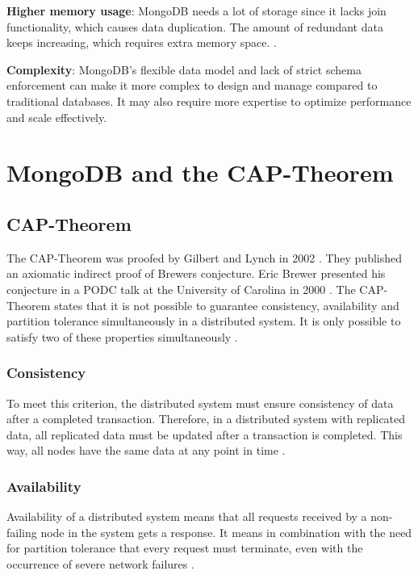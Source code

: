 \textbf{Higher memory usage}: MongoDB needs a lot of storage since it lacks join functionality, which causes data duplication. The amount of redundant data keeps increasing, which requires extra memory space. \parencite{knowledgenile-pro-con}.

\textbf{Complexity}: MongoDB's flexible data model and lack of strict schema enforcement can make it more complex to design and manage compared to traditional databases. It may also require more expertise to optimize performance and scale effectively.

\section{MongoDB and the CAP-Theorem}

\subsection{CAP-Theorem}

The \ac{CAP}-Theorem was proofed by Gilbert and Lynch in 2002 \parencite{brewer:2002}. They published an axiomatic indirect proof of Brewers conjecture. Eric Brewer presented his conjecture in a \ac{PODC} talk at the University of Carolina in 2000 \parencite{brewer2000towards}. The \ac{CAP}-Theorem states that it is not possible to guarantee consistency, availability and partition tolerance simultaneously in a distributed system. It is only possible to satisfy two of these properties simultaneously \parencite[1]{brewer:2002}.

\subsubsection*{Consistency}

To meet this criterion, the distributed system must ensure consistency of data after a completed transaction. Therefore, in a distributed system with replicated data, all replicated data must be updated after a transaction is completed. This way, all nodes have the same data at any point in time \parencite[2\psqq]{brewer:2002}.

\subsubsection*{Availability}

Availability of a distributed system means that all requests received by a non-failing node in the system gets a response. It means in combination with the need for partition tolerance that every request must terminate, even with the occurrence of severe network failures \parencite[3]{brewer:2002}.

